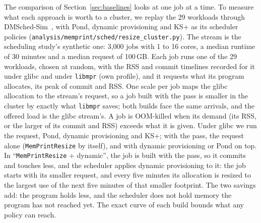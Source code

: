 \documentclass[11pt]{article}
\newcommand{\libmpr}{\texttt{libmpr}}
\newcommand{\pass}{\texttt{MemPrintResize}}
\newcommand{\secref}[1]{Section~\ref{#1}}
\begin{document}
\begin{table}[t]
\centering\small
\resizebox{\textwidth}{!}{}
\caption{Throughput (jobs per hour) and mean response time at offered loads 0.8 and 1.2, failures per stream at 0.8
(OOM kills, and dynamic provisioning's restarts), and the total memory (32 nodes plus the 1\,TB pool) each policy
needs at load 0.8 for a mean bounded slowdown within 1.5 times the glibc build's exact curve at 128\,GB per node,
from a sweep over 64 to 320\,GB per node.}
\label{tab:cluster}
\end{table}

The comparison of \secref{sec:baselines} looks at one job at a time. To measure what each approach is worth to a
cluster, we replay the 29 workloads through DMSched-Sim~\cite{memprintsched}, with Pond, dynamic provisioning and
KS+ as its scheduler policies (\texttt{analysis/memprint/sched/resize\_cluster.py}). The stream is the scheduling
study's synthetic one: 3{,}000 jobs with 1 to 16 cores, a median runtime of 30 minutes and a median request of
100\,GB. Each job runs one of the 29 workloads, chosen at random, with the RSS and commit timelines recorded for it
under glibc and under \libmpr{} (own profile), and it requests what its program allocates, its peak of commit and
RSS. One scale per job maps the glibc allocation to the stream's request, so a job built with the pass is smaller in
the cluster by exactly what \libmpr{} saves; both builds face the same arrivals, and the offered load is the glibc
stream's. A job is OOM-killed when its demand (its RSS, or the larger of its commit and RSS) exceeds what it is
given. Under glibc we run the request, Pond, dynamic provisioning and KS+; with the pass, the request alone
(\pass{} by itself), and with dynamic provisioning or Pond on top. In ``\pass{} + dynamic'', the job is built with
the pass, so it commits and touches less, and the scheduler applies dynamic provisioning to it: the job starts with
its smaller request, and every five minutes its allocation is resized to the largest use of the next five minutes of
that smaller footprint. The two savings add: the program holds less, and the scheduler does not hold memory the
program has not reached yet. The exact curve of each build bounds what any
policy can reach.
\end{document}
